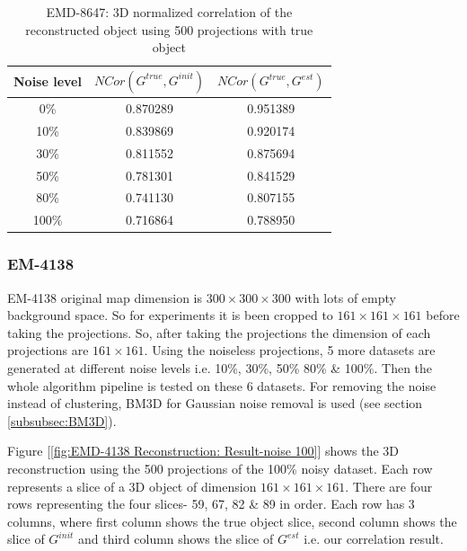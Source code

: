 \documentclass{report}
\begin{document}
\begin{table}[H]
    \centering
     \begin{tabular}{||c c c||} 
             \hline
             Noise level & $ NCor(G^{true},G^{init})$  &  $NCor(G^{true},G^{est})$ \\
             \hline\hline
            0\%  & 0.870289 & 0.951389 \\
            \hline
            10\% & 0.839869 & 0.920174	 \\
            \hline
            30\% & 0.811552 & 0.875694    \\
            \hline
            50\% & 0.781301 & 0.841529 \\
            \hline
            80\% & 0.741130 & 0.807155 \\
            \hline
            100\%& 0.716864 & 0.788950 \\[1ex] 
            \hline
    \end{tabular}
    \caption{EMD-8647: 3D normalized correlation of the reconstructed object using 500 projections with true object }
    \label{tbl:our_arp_8647_result-3d-correlation}
\end{table}

\subsubsection{EM-4138}

EM-4138 original map dimension is $300\times300\times300$  with lots of empty background space. So for experiments it is been  cropped to $161\times161\times161$ before taking the projections. So, after taking the projections the dimension of each projections are $161\times161$. Using the noiseless projections, 5 more datasets are generated at different noise levels i.e. 10\%, 30\%, 50\% 80\% \& 100\%. Then the whole algorithm pipeline is tested on these 6 datasets. For removing the noise instead of clustering, BM3D for Gaussian noise removal is used (see section \ref{subsubsec:BM3D}). 

Figure [\ref{fig:EMD-4138 Reconstruction: Result-noise 100}] shows the 3D reconstruction using the 500 projections of the 100\% noisy dataset. Each row represents a slice of a 3D object of dimension $161\times161\times161$. There are four rows representing the  four slices- 59, 67, 82 \& 89 in order. Each row has 3 columns, where first column shows the true object slice, second column shows the slice of $G^{init}$ and third column shows the slice of $G^{est}$ i.e. our correlation result.
\end{document}
